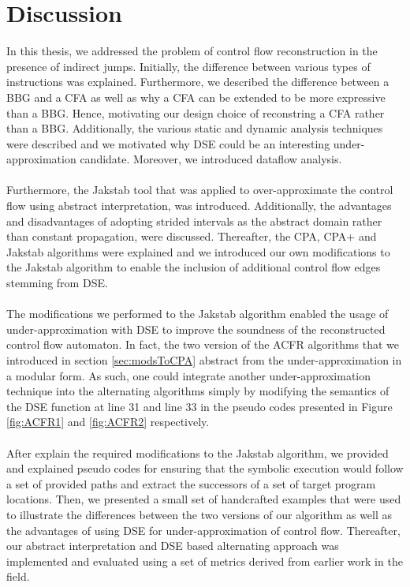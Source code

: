 \documentclass{kththesis}
\begin{document}
\section{Discussion}
In this thesis, we addressed the problem of control flow reconstruction in the presence of indirect jumps. Initially, the difference between various types of instructions was explained. Furthermore, we described the difference between a BBG and a CFA as well as why a CFA can be extended to be more expressive than a BBG. Hence, motivating our design choice of reconstring a CFA rather than a BBG. Additionally, the various static and dynamic analysis techniques were described and we motivated why DSE could be an interesting under-approximation candidate. Moreover, we introduced dataflow analysis.
\\ \\
Furthermore, the Jakstab tool that was applied to over-approximate the control flow using abstract interpretation, was introduced. Additionally, the advantages and disadvantages of adopting strided intervals as the abstract domain rather than constant propagation, were discussed. Thereafter, the CPA, CPA+ and Jakstab algorithms were explained and we introduced our own modifications to the Jakstab algorithm to enable the inclusion of additional control flow edges stemming from DSE.
\\ \\ 
The modifications we performed to the Jakstab algorithm enabled the usage of under-approximation with DSE to improve the soundness of the reconstructed control flow automaton. In fact, the two version of the ACFR algorithms that we introduced in section \ref{sec:modsToCPA} abstract from the under-approximation in a modular form. As such, one could integrate another under-approximation technique into the alternating algorithms simply by modifying the semantics of the DSE function at line 31 and line 33 in the pseudo codes presented in Figure \ref{fig:ACFR1} and \ref{fig:ACFR2} respectively.
\\ \\
After explain the required modifications to the Jakstab algorithm, we provided and explained pseudo codes for ensuring that the symbolic execution would follow a set of provided paths and extract the successors of a set of target program locations. Then, we presented a small set of handcrafted examples that were used to illustrate the differences between the two versions of our algorithm as well as the advantages of using DSE for under-approximation of control flow. Thereafter, our abstract interpretation and DSE based alternating approach was implemented and evaluated using a set of metrics derived from earlier work in the field.
\end{document}
